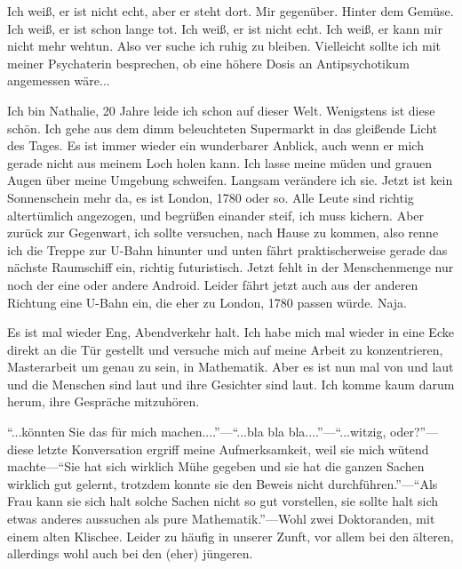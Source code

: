 \documentclass{article}
\title{\titlevar}
\author{\authorvar}
\date{\datevar}
\newcommand{\ms}{\medskip}
\begin{document}
	\maketitle

	Ich weiß, er ist nicht echt, aber er steht dort. Mir gegenüber. Hinter dem Gemüse. Ich weiß, er ist schon lange tot. Ich weiß, er ist nicht echt. Ich weiß, er kann mir nicht mehr wehtun. Also ver suche ich ruhig zu bleiben. Vielleicht sollte ich mit meiner Psychaterin besprechen, ob eine höhere Dosis an Antipsychotikum angemessen wäre...

	\ms

	Ich bin Nathalie, 20 Jahre leide ich schon auf dieser Welt. Wenigstens ist diese schön. Ich gehe aus dem dimm beleuchteten Supermarkt in das gleißende Licht des Tages. Es ist immer wieder ein wunderbarer Anblick, auch wenn er mich gerade nicht aus meinem Loch holen kann. Ich lasse meine müden und grauen Augen über meine Umgebung schweifen. Langsam verändere ich sie. Jetzt ist kein Sonnenschein mehr da, es ist London, 1780 oder so. Alle Leute sind richtig altertümlich angezogen, und begrüßen einander steif, ich muss kichern. Aber zurück zur Gegenwart, ich sollte versuchen, nach Hause zu kommen, also renne ich die Treppe zur U-Bahn hinunter und unten fährt praktischerweise gerade das nächste Raumschiff ein, richtig futuristisch. Jetzt fehlt in der Menschenmenge nur noch der eine oder andere Android. Leider fährt jetzt auch aus der anderen Richtung eine U-Bahn ein, die eher zu London, 1780 passen würde. Naja.

	\ms

	Es ist mal wieder Eng, Abendverkehr halt. Ich habe mich mal wieder in eine Ecke direkt an die Tür gestellt und versuche mich auf meine Arbeit zu konzentrieren, Masterarbeit um genau zu sein, in Mathematik. Aber es ist nun mal von und laut und die Menschen sind laut und ihre Gesichter sind laut. Ich komme kaum darum herum, ihre Gespräche mitzuhören.

	\ms

	\enquote{...könnten Sie das für mich machen....}—\enquote{...bla bla bla....}—\enquote{...witzig, oder?}—diese letzte Konversation ergriff meine Aufmerksamkeit, weil sie mich wütend machte—\enquote{Sie hat sich wirklich Mühe gegeben und sie hat die ganzen Sachen wirklich gut gelernt, trotzdem konnte sie den Beweis nicht durchführen.}—\enquote{Als Frau kann sie sich halt solche Sachen nicht so gut vorstellen, sie sollte halt sich etwas anderes aussuchen als pure Mathematik.}—Wohl zwei Doktoranden, mit einem alten Klischee. Leider zu häufig in unserer Zunft, vor allem bei den älteren, allerdings wohl auch bei den (eher) jüngeren.
\end{document}
